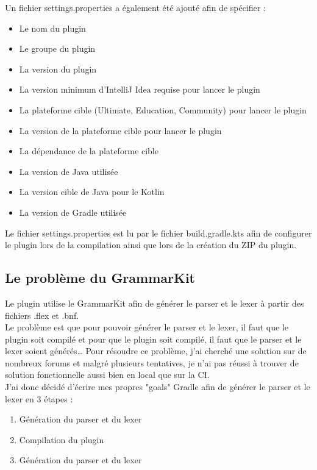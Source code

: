 Un fichier settings.properties a également été ajouté afin de spécifier :
\begin{itemize}
    \item Le nom du plugin
    \item Le groupe du plugin
    \item La version du plugin
    \item La version minimum d'IntelliJ Idea requise pour lancer le plugin
    \item La plateforme cible (Ultimate, Education, Community) pour lancer le plugin
    \item La version de la plateforme cible pour lancer le plugin
    \item La dépendance de la plateforme cible
    \item La version de Java utilisée
    \item La version cible de Java pour le Kotlin
    \item La version de Gradle utilisée
\end{itemize}

Le fichier settings.properties est lu par le fichier build.gradle.kts afin de configurer le plugin lors de la compilation ainsi que lors de la création du ZIP du plugin.

\subsection{Le problème du GrammarKit}
\noindent
Le plugin utilise le GrammarKit afin de générer le parser et le lexer à partir des fichiers .flex et .bnf.
\\ \noindent Le problème est que pour pouvoir générer le parser et le lexer, il faut que le plugin soit compilé et pour que le plugin soit compilé, il faut que le parser et le lexer soient générés\ldots
\newdoubleline
Pour résoudre ce problème, j'ai cherché une solution sur de nombreux forums et malgré plusieurs tentatives, je n'ai pas réussi à trouver de solution fonctionnelle aussi bien en local que sur la CI.
\\ \noindent J'ai donc décidé d'écrire mes propres "goals" Gradle afin de générer le parser et le lexer en 3 étapes :
\begin{enumerate}
    \item Génération du parser et du lexer
    \item Compilation du plugin
    \item Génération du parser et du lexer
\end{enumerate}


